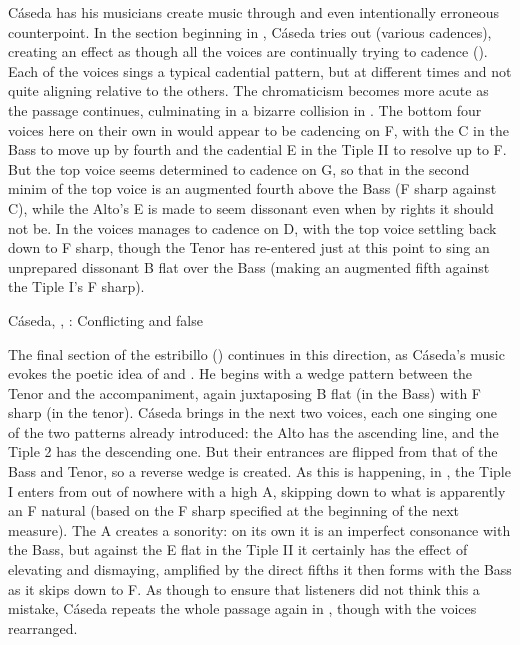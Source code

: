 
Cáseda has his musicians create  music through 
and even intentionally erroneous counterpoint.
In the section beginning in , Cáseda tries out  (various cadences), creating an effect as though all the voices are  
continually trying to cadence ().
Each of the voices sings a typical cadential pattern, but at different times
and not quite aligning relative to the others.
The chromaticism becomes more acute as the passage continues, culminating in a
bizarre collision in .
The bottom four voices here on their own in  would appear to be
cadencing on F, with the C in the Bass to move up by fourth and the cadential E
in the Tiple II to resolve up to F.
But the top voice seems determined to cadence on G, so that in the second minim
of  the top voice is an augmented fourth above the Bass (F sharp
against C), while the Alto's E is made to seem dissonant even when by rights it
should not be.
In  the voices manages to cadence on D, with the top voice settling
back down to F sharp, though the Tenor has re-entered just at this point to sing
an unprepared dissonant B flat over the Bass (making an augmented fifth against
the Tiple I's F sharp).


\begin{musicexample}
    \caption{Cáseda, , :
    Conflicting  and false }
    \label{mus:CasedaJ-Que_musica_divina-clausulas}
\end{musicexample}

The final section of the estribillo
() continues in this direction,
as Cáseda's music evokes the poetic idea of  and
.
He begins with a wedge pattern between the Tenor and the accompaniment, again
juxtaposing B flat (in the Bass) with F sharp (in the tenor).
Cáseda brings in the next two voices, each one singing one of the two patterns
already introduced: the Alto has the ascending line, and the Tiple 2 has the
descending one.
But their entrances are flipped from that of the Bass and Tenor, so a reverse
wedge is created.
As this is happening, in , the Tiple I enters from out of nowhere
with a high A, skipping down to what is apparently an F natural (based on the
F sharp specified at the beginning of the next measure).
The A creates a  sonority: on its own it is an imperfect
consonance with the Bass, but against the E flat in the Tiple II it certainly
has the effect of elevating and dismaying, amplified by the direct fifths it
then forms with the Bass as it skips down to F.
As though to ensure that listeners did not think this a mistake, Cáseda repeats
the whole passage again in , though with the voices rearranged.

